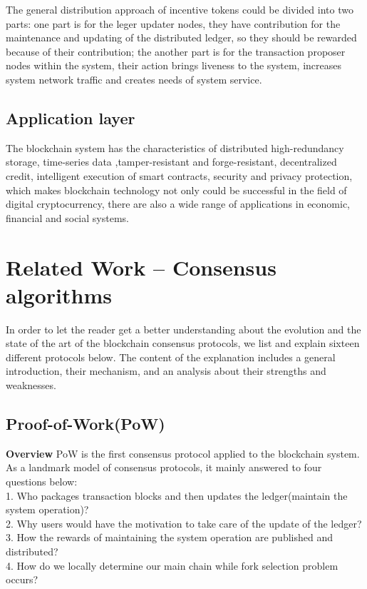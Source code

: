 \documentclass[doublespacing]{bmcart}
\begin{document}
\begin{CJK*}{UTF8}{gbsn}
\begin{description}
The general distribution approach of incentive tokens could be divided into two parts: one part is for the leger updater nodes, they have contribution for the maintenance and updating of the distributed ledger, so they should be rewarded because of their contribution; the another part is for the transaction proposer nodes within the system, their action brings liveness to the system, increases system network traffic and creates needs of system service. 
\end{description}

\subsection{\textbf{Application layer}}
The blockchain system has the characteristics of distributed high-redundancy storage, time-series data ,tamper-resistant and forge-resistant, decentralized credit, intelligent execution of smart contracts, security and privacy protection, which makes blockchain technology not only could be successful in the field of digital cryptocurrency, there are also a wide range of applications in economic, financial and social systems.

\section{Related Work – Consensus algorithms}
	In order to let the reader get a better understanding about the evolution and the state of the art of the blockchain consensus protocols, we list and explain sixteen different protocols below. The content of the explanation includes a general introduction, their mechanism, and an analysis about their strengths and weaknesses.

	\subsection{Proof-of-Work(PoW)}
    \textbf{Overview}
     PoW is the first consensus protocol applied to the blockchain system. As a landmark model of consensus protocols, it mainly answered to four questions below:
    \\1. Who packages transaction blocks and then updates the ledger(maintain the system operation)?
    \\2. Why users would have the motivation to take care of the update of the ledger?
    \\3. How the rewards of maintaining the system operation are published and distributed?
    \\4. How do we locally determine our main chain while fork selection problem occurs?
    

\end{CJK*}
\end{document}
